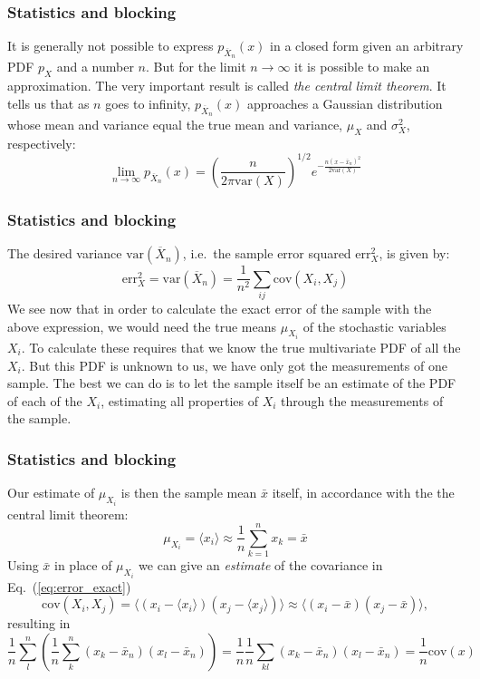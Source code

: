 \documentclass{beamer}
\begin{document}
\begin{frame}
\frametitle{Statistics and blocking}

\begin{block}{}
It is generally not possible to express $p_{\overline X_n}(x)$ in a
closed form given an arbitrary PDF $p_X^{\phantom X}$ and a number
$n$. But for the limit $n\to\infty$ it is possible to make an
approximation. The very important result is called \emph{the central limit theorem}. It tells us that as $n$ goes to infinity,
$p_{\overline X_n}(x)$ approaches a Gaussian distribution whose mean
and variance equal the true mean and variance, $\mu_{X}^{\phantom X}$
and $\sigma_{X}^{2}$, respectively:
\begin{equation}
\lim_{n\to\infty} p_{\overline X_n}(x) =
\left(\frac{n}{2\pi\mathrm{var}(X)}\right)^{1/2}
e^{-\frac{n(x-\bar x_n)^2}{2\mathrm{var}(X)}}
\label{eq:central_limit_gaussian}
\end{equation}
\end{block}
\end{frame}

\begin{frame}
\frametitle{Statistics and blocking}

\begin{block}{}
The desired variance
$\mathrm{var}(\overline X_n)$, i.e.~the sample error squared
$\mathrm{err}_X^2$, is given by:
\begin{equation}
\mathrm{err}_X^2 = \mathrm{var}(\overline X_n) = \frac{1}{n^2}
\sum_{ij} \mathrm{cov}(X_i, X_j)
\label{eq:error_exact}
\end{equation}
We see now that in order to calculate the exact error of the sample
with the above expression, we would need the true means
$\mu_{X_i}^{\phantom X}$ of the stochastic variables $X_i$. To
calculate these requires that we know the true multivariate PDF of all
the $X_i$. But this PDF is unknown to us, we have only got the measurements of
one sample. The best we can do is to let the sample itself be an
estimate of the PDF of each of the $X_i$, estimating all properties of
$X_i$ through the measurements of the sample.
\end{block}
\end{frame}

\begin{frame}
\frametitle{Statistics and blocking}

\begin{block}{}
Our estimate of $\mu_{X_i}^{\phantom X}$ is then the sample mean $\bar x$
itself, in accordance with the the central limit theorem:
\[
\mu_{X_i}^{\phantom X} = \langle x_i\rangle \approx \frac{1}{n}\sum_{k=1}^n x_k = \bar x
\]
Using $\bar x$ in place of $\mu_{X_i}^{\phantom X}$ we can give an
\emph{estimate} of the covariance in Eq.~(\ref{eq:error_exact})
\[
\mathrm{cov}(X_i, X_j) = \langle (x_i-\langle x_i\rangle)(x_j-\langle x_j\rangle)\rangle
\approx\langle (x_i - \bar x)(x_j - \bar{x})\rangle,
\]
resulting in
\[ 
\frac{1}{n} \sum_{l}^n \left(\frac{1}{n}\sum_{k}^n (x_k -\bar x_n)(x_l - \bar x_n)\right)=\frac{1}{n}\frac{1}{n} \sum_{kl} (x_k -\bar x_n)(x_l - \bar x_n)=\frac{1}{n}\mathrm{cov}(x)
\]
\end{block}
\end{frame}
\end{document}

